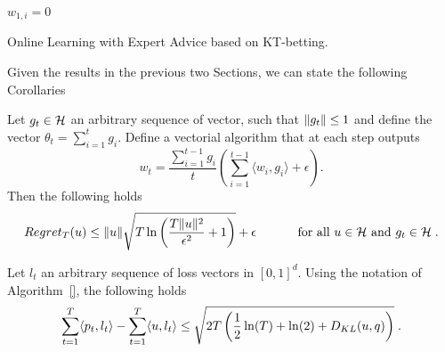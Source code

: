 \begin{algorithm}[t]
  \begin{algorithmic}
  {
     $w_{1,i}=0$
    \ENDFOR
  }
  \end{algorithmic}
  \caption{Online Learning with Expert Advice based on \ac{KT}-betting.}
  \label{alg:kt_expert}
\end{algorithm}

Given the results in the previous two Sections, we can state the following Corollaries

\begin{cor}
  Let $g_t \in \mathcal{H}$ an arbitrary sequence of vector, such that $\left\|{g_t}\right\| \leq 1$ and define the vector $\theta_t=\sum_{i=1}^{t} g_i$.
  Define a vectorial algorithm that at each step outputs 
  \[
  w_t = \frac{\sum_{i=1}^{t-1} g_i}{t} \left(\sum_{i=1}^{t-1} \langle w_i, g_i \rangle + \epsilon\right).
  \]
  Then the following holds
  \[
    Regret_T(u) \leq \|u\| \sqrt{T \ln \left(\frac{T \|u\|^2}{\epsilon^2}+1\right)}+\epsilon \quad \quad \quad \textnormal{ for all } u \in \mathcal{H} \textnormal{ and } g_t \in \mathcal{H} \; .
  \]
\end{cor}

\begin{cor}
Let $l_t$ an arbitrary sequence of loss vectors in $[0,1]^d$. Using the notation of Algorithm~\ref{}, the following holds
\[
\sum_{t=1}^T \langle p_t, l_t\rangle -\sum_{t=1}^T \langle u , l_t\rangle 
\leq \sqrt{2 T \left( \frac{1}{2} \ln(T) + \ln(2) + D_{KL}(u,q)\right)} \; .
\]
\end{cor}